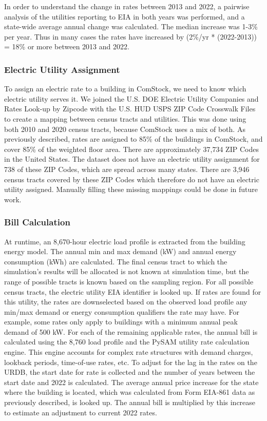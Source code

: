In order to understand the change in rates between 2013 and 2022, a pairwise analysis of the utilities reporting to EIA \citep{eia_electricity} in both years was performed, and a state-wide average annual change was calculated. The median increase was 1-3\% per year. Thus in many cases the rates have increased by (2\%/yr * (2022-2013)) = 18\% or more between 2013 and 2022.

\subsubsection{Electric Utility Assignment}
To assign an electric rate to a building in ComStock, we need to know which electric utility serves it. We joined the U.S. DOE Electric Utility Companies and Rates Look-up by Zipcode \citep{zip_to_util} with the U.S. HUD USPS ZIP Code Crosswalk Files \citep{tract_to_zip} to create a mapping between census tracts and utilities. This was done using both 2010 and 2020 census tracts, because ComStock uses a mix of both.
As previously described, rates are assigned to 85\% of the buildings in ComStock, and cover 85\% of the weighted floor area. There are approximately 37,734 ZIP Codes in the United States. The dataset does not have an electric utility assignment for 738 of these ZIP Codes, which are spread across many states. There are 3,946 census tracts covered by these ZIP Codes which therefore do not have an electric utility assigned. Manually filling these missing mappings could be done in future work.

\subsubsection{Bill Calculation}
At runtime, an 8,670-hour electric load profile is extracted from the building energy model. The annual min and max demand (kW) and annual energy consumption (kWh) are calculated. The final census tract to which the simulation's results will be allocated is not known at simulation time, but the range of possible tracts is known based on the sampling region. For all possible census tracts, the electric utility EIA identifier is looked up. If rates are found for this utility, the rates are downselected based on the observed load profile any min/max demand or energy consumption qualifiers the rate may have. For example, some rates only apply to buildings with a minimum annual peak demand of 500 kW.
For each of the remaining applicable rates, the annual bill is calculated using the 8,760 load profile and the PySAM utility rate calculation engine. This engine accounts for complex rate structures with demand charges, lookback periods, time-of-use rates, etc. To adjust for the lag in the rates on the URDB, the start date for rate is collected and the number of years between the start date and 2022 is calculated. The average annual price increase for the state where the building is located, which was calculated from Form EIA-861 data as previously described, is looked up. The annual bill is multiplied by this increase to estimate an adjustment to current 2022 rates.


